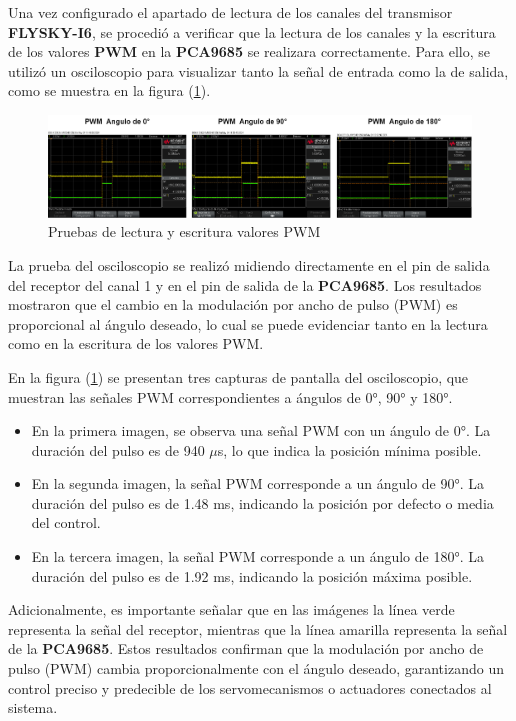         Una vez configurado el apartado de lectura de los canales del transmisor \textbf{FLYSKY-I6}, se procedió a verificar que la lectura de los canales y la escritura de los valores \textbf{PWM} en la \textbf{PCA9685} se realizara correctamente. Para ello, se utilizó un osciloscopio para visualizar tanto la señal de entrada como la de salida, como se muestra en la figura (\ref{fig:pruebasPWM}).


        \begin{figure}[H]
            \centering
            \includegraphics[width=7 in]{Imagenes/Pruebas/pwm canales.png}
            \caption{Pruebas de lectura y escritura valores PWM}
            \label{fig:pruebasPWM}
        \end{figure}

        La prueba del osciloscopio se realizó midiendo directamente en el pin de salida del receptor del canal 1 y en el pin de salida de la \textbf{PCA9685}. Los resultados mostraron que el cambio en la modulación por ancho de pulso (PWM) es proporcional al ángulo deseado, lo cual se puede evidenciar tanto en la lectura como en la escritura de los valores PWM.

        En la figura (\ref{fig:pruebasPWM}) se presentan tres capturas de pantalla del osciloscopio, que muestran las señales PWM correspondientes a ángulos de 0°, 90° y 180°. 

        \begin{itemize}
            \item En la primera imagen, se observa una señal PWM con un ángulo de 0°. La duración del pulso es de 940 $\mu$s, lo que indica la posición mínima posible.
            \item En la segunda imagen, la señal PWM corresponde a un ángulo de 90°. La duración del pulso es de 1.48 ms, indicando la posición por defecto o media del control.
            \item En la tercera imagen, la señal PWM corresponde a un ángulo de 180°. La duración del pulso es de 1.92 ms, indicando la posición máxima posible.
        \end{itemize}

        Adicionalmente, es importante señalar que en las imágenes la línea verde representa la señal del receptor, mientras que la línea amarilla representa la señal de la \textbf{PCA9685}. Estos resultados confirman que la modulación por ancho de pulso (PWM) cambia proporcionalmente con el ángulo deseado, garantizando un control preciso y predecible de los servomecanismos o actuadores conectados al sistema.
        \vspace{5 px}
